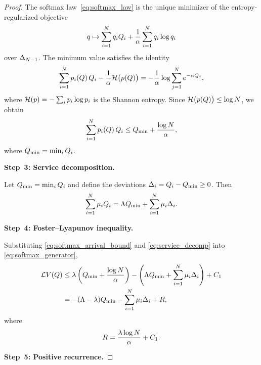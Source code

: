 \begin{proof}
The softmax law~\eqref{eq:softmax_law} is the unique minimizer of the entropy-regularized objective
\begin{equation}
\label{eq:softmax_variational}
q \mapsto \sum_{i=1}^{N} q_i Q_{i} + \frac{1}{\alpha} \sum_{i=1}^{N} q_i \log q_i
\end{equation}
over $\Delta_{N-1}$. The minimum value satisfies the identity
\begin{equation}
\label{eq:softmax_identity}
\sum_{i=1}^{N} p_{i}(Q)\, Q_{i} - \frac{1}{\alpha}\mathcal{H}\bigl(p(Q)\bigr) = -\frac{1}{\alpha}\log \sum_{j=1}^{N} e^{-\alpha Q_{j}},
\end{equation}
where $\mathcal{H}(p) = -\sum_i p_i \log p_i$ is the Shannon entropy. Since $\mathcal{H}\bigl(p(Q)\bigr) \leq \log N$, we obtain
\begin{equation}
\label{eq:softmax_arrival_bound}
\sum_{i=1}^{N} p_{i}(Q)\, Q_{i}
\leq Q_{\min} + \frac{\log N}{\alpha},
\end{equation}
where $Q_{\min} = \min_i Q_{i}$.

\medskip
\noindent\textbf{Step~3: Service decomposition.}

Let $Q_{\min} = \min_i Q_{i}$ and define the deviations $\Delta_i = Q_{i} - Q_{\min} \geq 0$. Then
\begin{equation}
\label{eq:service_decomp}
\sum_{i=1}^{N} \mu_i Q_{i}
= \Lambda Q_{\min} + \sum_{i=1}^{N} \mu_i \Delta_i.
\end{equation}

\medskip
\noindent\textbf{Step~4: Foster--Lyapunov inequality.}

Substituting \cref{eq:softmax_arrival_bound} and \cref{eq:service_decomp} into \cref{eq:softmax_generator},
\begin{align}
\mathcal{L} V(Q)
&\leq \lambda\left(Q_{\min} + \frac{\log N}{\alpha}\right)
  - \left(\Lambda Q_{\min} + \sum_{i=1}^{N} \mu_i \Delta_i\right) + C_1 \nonumber \\
&= -(\Lambda - \lambda)Q_{\min} - \sum_{i=1}^{N} \mu_i \Delta_i + R,
\label{eq:softmax_foster}
\end{align}
where
\begin{equation}
\label{eq:softmax_R}
R = \frac{\lambda \log N}{\alpha} + C_1.
\end{equation}

\medskip
\noindent\textbf{Step~5: Positive recurrence.}


\end{proof}
